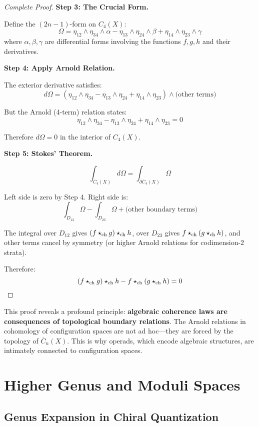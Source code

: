 \begin{proof}[Complete Proof]
\textbf{Step 3: The Crucial Form.}

Define the $(2n-1)$-form on $C_4(X)$:
$$\Omega = \eta_{12} \wedge \eta_{34} \wedge \alpha - \eta_{13} \wedge \eta_{24} \wedge \beta + \eta_{14} \wedge \eta_{23} \wedge \gamma$$
where $\alpha, \beta, \gamma$ are differential forms involving the functions $f,g,h$ and their derivatives.

\textbf{Step 4: Apply Arnold Relation.}

The exterior derivative satisfies:
$$d\Omega = (\eta_{12} \wedge \eta_{34} - \eta_{13} \wedge \eta_{24} + \eta_{14} \wedge \eta_{23}) \wedge \text{(other terms)}$$

But the Arnold (4-term) relation \cite{arnold, OS80} states:
$$\eta_{12} \wedge \eta_{34} - \eta_{13} \wedge \eta_{24} + \eta_{14} \wedge \eta_{23} = 0$$

Therefore $d\Omega = 0$ in the interior of $C_4(X)$.

\textbf{Step 5: Stokes' Theorem.}

$$\int_{\overline{C}_4(X)} d\Omega = \int_{\partial \overline{C}_4(X)} \Omega$$

Left side is zero by Step 4. Right side is:
$$\int_{D_{12}} \Omega - \int_{D_{23}} \Omega + \text{(other boundary terms)}$$

The integral over $D_{12}$ gives $(f \star_{\text{ch}} g) \star_{\text{ch}} h$, over $D_{23}$ gives $f \star_{\text{ch}} (g \star_{\text{ch}} h)$, and other terms cancel by symmetry (or higher Arnold relations for codimension-2 strata).

Therefore:
$$(f \star_{\text{ch}} g) \star_{\text{ch}} h - f \star_{\text{ch}} (g \star_{\text{ch}} h) = 0$$
\end{proof}

\begin{remark}
This proof reveals a profound principle: \textbf{algebraic coherence laws are consequences of topological boundary relations}. The Arnold relations in cohomology of configuration spaces are not ad hoc---they are forced by the topology of $\overline{C}_n(X)$. This is why operads, which encode algebraic structures, are intimately connected to configuration spaces.
\end{remark}

\section{Higher Genus and Moduli Spaces}
\label{sec:higher-genus-moduli}

\subsection{Genus Expansion in Chiral Quantization}

